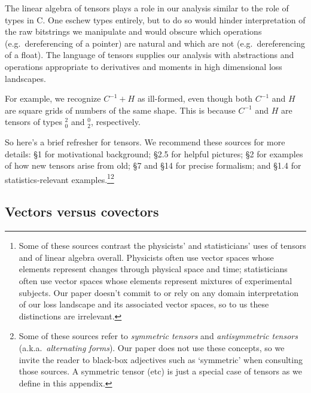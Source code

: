 
        The linear algebra of tensors plays a role in our analysis similar to
        the role of types in C.  One eschew types entirely, but to
        do so would hinder interpretation of the raw bitstrings we manipulate
        and would obscure which operations (e.g.\ dereferencing of a pointer)
        are natural and which are not (e.g.\ dereferencing of a float). 
        The language of tensors supplies our analysis with
        abstractions and operations appropriate to derivatives and
        moments in high dimensional loss landscapes.

        For example, we recognize $C^{-1} + H$ as ill-formed, even
        though both $C^{-1}$ and $H$ are square grids of
        numbers of the same shape.  This is because $C^{-1}$ and $H$ are
        tensors of types $^2_0$ and $^0_2$, respectively.

        So here's a brief refresher for tensors.  
        We recommend these sources for more details:
        \cite{si17} \S1 for motivational background;
        \cite{mi73} \S2.5 for helpful pictures;
        \cite{co14} \S2 for examples of how new tensors arise from old;
        \cite{ko93} \S7 and \S14 for precise formalism; and
        \cite{cu87} \S1.4 for statistics-relevant examples.\footnote{
            Some of these sources contrast the physicists' and statisticians'
            uses of tensors and of linear algebra overall.
            Physicists often use vector spaces whose elements represent changes
            through physical space and time; statisticians often use vector
            spaces whose elements represent mixtures of experimental subjects.
            Our paper doesn't commit to or rely on any domain interpretation
            of our loss landscape and its associated vector spaces, so to us
            these distinctions are irrelevant. 
        }\footnote{
            Some of these sources refer to
            \emph{symmetric tensors} and \emph{antisymmetric tensors} (a.k.a.\
            \emph{alternating forms}).  Our paper does not use these concepts,
            so we invite the reader to black-box adjectives such as
            `symmetric' when consulting those sources.  A symmetric tensor
            (etc) is just a special case of tensors as we define in this
            appendix.
        }
        \subsection{Vectors versus covectors}
            
